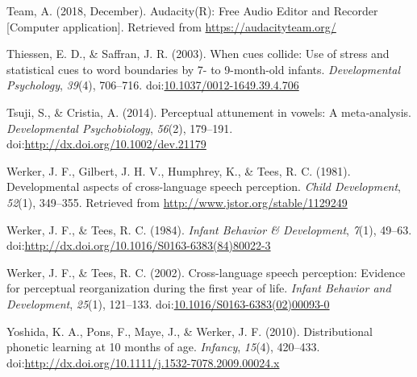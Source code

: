\documentclass[man,floatsintext]{apa6}
\begin{document}
\leavevmode\hypertarget{ref-audacity}{}%
Team, A. (2018, December). Audacity(R): Free Audio Editor and Recorder {[}Computer application{]}. Retrieved from \href{https://audacityteam.org/\%20}{https://audacityteam.org/ }

\leavevmode\hypertarget{ref-thiessen2003}{}%
Thiessen, E. D., \& Saffran, J. R. (2003). When cues collide: Use of stress and statistical cues to word boundaries by 7- to 9-month-old infants. \emph{Developmental Psychology}, \emph{39}(4), 706--716. doi:\href{https://doi.org/10.1037/0012-1649.39.4.706}{10.1037/0012-1649.39.4.706}

\leavevmode\hypertarget{ref-tsuji2014}{}%
Tsuji, S., \& Cristia, A. (2014). Perceptual attunement in vowels: A meta‐analysis. \emph{Developmental Psychobiology}, \emph{56}(2), 179--191. doi:\href{https://doi.org/http://dx.doi.org/10.1002/dev.21179}{http://dx.doi.org/10.1002/dev.21179}

\leavevmode\hypertarget{ref-werker1981}{}%
Werker, J. F., Gilbert, J. H. V., Humphrey, K., \& Tees, R. C. (1981). Developmental aspects of cross-language speech perception. \emph{Child Development}, \emph{52}(1), 349--355. Retrieved from \url{http://www.jstor.org/stable/1129249}

\leavevmode\hypertarget{ref-werker1984}{}%
Werker, J. F., \& Tees, R. C. (1984). \emph{Infant Behavior \& Development}, \emph{7}(1), 49--63. doi:\href{https://doi.org/http://dx.doi.org/10.1016/S0163-6383(84)80022-3}{http://dx.doi.org/10.1016/S0163-6383(84)80022-3}

\leavevmode\hypertarget{ref-werker2002}{}%
Werker, J. F., \& Tees, R. C. (2002). Cross-language speech perception: Evidence for perceptual reorganization during the first year of life. \emph{Infant Behavior and Development}, \emph{25}(1), 121--133. doi:\href{https://doi.org/10.1016/S0163-6383(02)00093-0}{10.1016/S0163-6383(02)00093-0}

\leavevmode\hypertarget{ref-yoshida2010}{}%
Yoshida, K. A., Pons, F., Maye, J., \& Werker, J. F. (2010). Distributional phonetic learning at 10 months of age. \emph{Infancy}, \emph{15}(4), 420--433. doi:\href{https://doi.org/http://dx.doi.org/10.1111/j.1532-7078.2009.00024.x}{http://dx.doi.org/10.1111/j.1532-7078.2009.00024.x}

\endgroup
\end{document}
